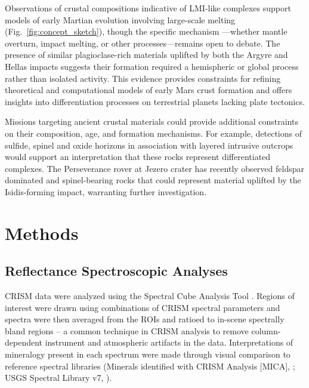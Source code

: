 \documentclass[12pt]{article}
\begin{document}
Observations of crustal compositions indicative of LMI-like complexes support models of early Martian evolution involving large-scale melting (Fig.~\ref{fig:concept_sketch}), though the specific mechanism ---whether mantle overturn, impact melting, or other processes---remains open to debate. The presence of similar plagioclase-rich materials uplifted by both the Argyre and Hellas impacts suggests their formation required a hemispheric or global process rather than isolated activity. This evidence provides constraints for refining theoretical and computational models of early Mars crust formation and offers insights into differentiation processes on terrestrial planets lacking plate tectonics.

Missions targeting ancient crustal materials could provide additional constraints on their composition, age, and formation mechanisms. For example, detections of sulfide, spinel and oxide horizons in association with layered intrusive outcrops would support an interpretation that these rocks represent differentiated complexes. The Perseverance rover at Jezero crater has recently observed feldspar dominated \citep{Bedford2024, Schmidt2025} and spinel-bearing rocks \citep{Mansbach2024, Bedford2024, Lawson2025} that could represent material uplifted by the Isidis-forming impact, warranting further investigation.

\section*{Methods}

\subsection*{Reflectance Spectroscopic Analyses}

CRISM data were analyzed using the Spectral Cube Analysis Tool \citep{Phillips2024}. Regions of interest were drawn using combinations of CRISM spectral parameters \citep{Viviano2014} and spectra were then averaged from the ROIs and ratioed to in-scene spectrally bland regions -- a common technique in CRISM analysis to remove column-dependent instrument and atmospheric artifacts in the data. Interpretations of mineralogy present in each spectrum were made through visual comparison to reference spectral libraries (Minerals identified with CRISM Analysis [MICA], \citealt{Viviano2014}; USGS Spectral Library v7, \citealt{Kokaly2017}).
\end{document}
